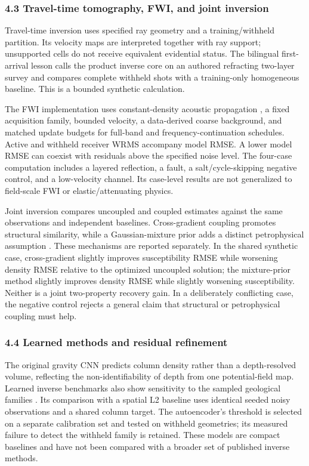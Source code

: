 \subsubsection{4.3 Travel-time tomography, FWI, and joint
inversion}\label{travel-time-tomography-fwi-and-joint-inversion}

Travel-time inversion uses specified ray geometry and a
training/withheld partition. Its velocity maps are interpreted together
with ray support; unsupported cells do not receive equivalent evidential
status. The bilingual first-arrival lesson calls the product inverse core on an
authored refracting two-layer survey and compares complete withheld
shots with a training-only homogeneous baseline. This is a bounded
synthetic calculation.

The FWI implementation uses constant-density acoustic propagation
\cite{virieux2009,deepwave}, a fixed acquisition family, bounded
velocity, a data-derived coarse background, and matched update budgets
for full-band and frequency-continuation schedules. Active and withheld
receiver WRMS accompany model RMSE. A lower model RMSE can coexist with
residuals above the specified noise level. The four-case computation
includes a layered reflection, a fault, a salt/cycle-skipping negative
control, and a low-velocity channel. Its case-level results are not
generalized to field-scale FWI or elastic/attenuating physics.

Joint inversion compares uncoupled and coupled estimates against the
same observations and independent baselines. Cross-gradient coupling
promotes structural similarity, while a Gaussian-mixture prior adds a
distinct petrophysical assumption \cite{simpegJoint,astic2020}. These
mechanisms are reported separately. In the shared synthetic case,
cross-gradient slightly improves susceptibility RMSE while worsening
density RMSE relative to the optimized uncoupled solution; the
mixture-prior method slightly improves density RMSE while slightly
worsening susceptibility. Neither is a joint two-property recovery gain.
In a deliberately conflicting case, the negative control rejects a
general claim that structural or petrophysical coupling must help.

\subsubsection{4.4 Learned methods and residual
refinement}\label{learned-methods-and-residual-refinement}

The original gravity CNN predicts column density rather than a
depth-resolved volume, reflecting the non-identifiability of depth from
one potential-field map. Learned inverse benchmarks also show
sensitivity to the sampled geological families \cite{openfwi}. Its
comparison with a spatial L2 baseline uses identical seeded noisy
observations and a shared column target. The autoencoder's threshold is
selected on a separate calibration set and tested on withheld
geometries; its measured failure to detect the withheld family is
retained. These models are compact baselines and have not been compared
with a broader set of published inverse methods.

